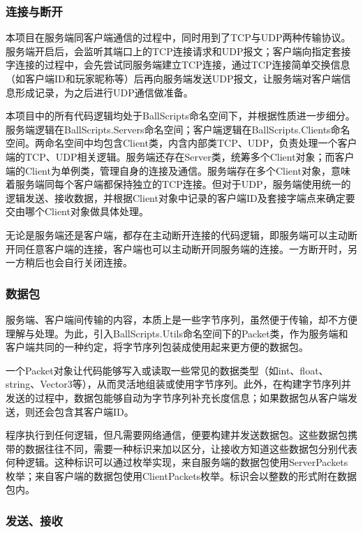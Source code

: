 \documentclass[conference]{IEEEtran}
\begin{document}
\subsubsection{连接与断开}
\quad 

本项目在服务端同客户端通信的过程中，同时用到了TCP与UDP两种传输协议。服务端开启后，会监听其端口上的TCP连接请求和UDP报文；客户端向指定套接字连接的过程中，会先尝试同服务端建立TCP连接，通过TCP连接简单交换信息（如客户端ID和玩家昵称等）后再向服务端发送UDP报文，让服务端对客户端信息形成记录，为之后进行UDP通信做准备。

本项目中的所有代码逻辑均处于BallScripts命名空间下，并根据性质进一步细分。服务端逻辑在BallScripts.Servers命名空间；客户端逻辑在BallScripts.Clients命名空间。两命名空间中均包含Client类，内含内部类TCP、UDP，负责处理一个客户端的TCP、UDP相关逻辑。服务端还存在Server类，统筹多个Client对象；而客户端的Client为单例类，管理自身的连接及通信。服务端存在多个Client对象，意味着服务端同每个客户端都保持独立的TCP连接。但对于UDP，服务端使用统一的逻辑发送、接收数据，并根据Client对象中记录的客户端ID及套接字端点来确定要交由哪个Client对象做具体处理。

无论是服务端还是客户端，都存在主动断开连接的代码逻辑，即服务端可以主动断开同任意客户端的连接，客户端也可以主动断开同服务端的连接。一方断开时，另一方稍后也会自行关闭连接。

\subsubsection{数据包}
\quad

服务端、客户端间传输的内容，本质上是一些字节序列，虽然便于传输，却不方便理解与处理。为此，引入BallScripts.Utils命名空间下的Packet类，作为服务端和客户端共同的一种约定，将字节序列包装成使用起来更方便的数据包。

一个Packet对象让代码能够写入或读取一些常见的数据类型（如int、float、string、Vector3等），从而灵活地组装或使用字节序列。此外，在构建字节序列并发送的过程中，数据包能够自动为字节序列补充长度信息；如果数据包从客户端发送，则还会包含其客户端ID。

程序执行到任何逻辑，但凡需要网络通信，便要构建并发送数据包。这些数据包携带的数据往往不同，需要一种标识来加以区分，让接收方知道这些数据包分别代表何种逻辑。这种标识可以通过枚举实现，来自服务端的数据包使用ServerPackets枚举；来自客户端的数据包使用ClientPackets枚举。标识会以整数的形式附在数据包内。

\subsubsection{发送、接收}
\quad
\end{document}
